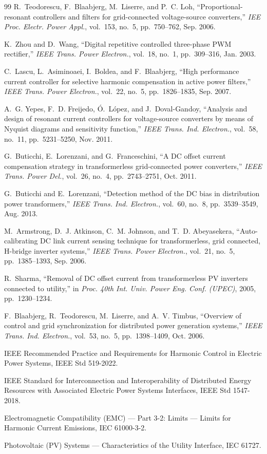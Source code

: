 \documentclass[11pt,a4paper]{article}
\begin{document}
\begin{thebibliography}{99}
R.~Teodorescu, F.~Blaabjerg, M.~Liserre, and P.~C. Loh, ``Proportional-resonant
controllers and filters for grid-connected voltage-source converters,'' \emph{IEE Proc.
Electr. Power Appl.}, vol.~153, no.~5, pp.~750--762, Sep. 2006.

K.~Zhou and D.~Wang, ``Digital repetitive controlled three-phase PWM rectifier,''
\emph{IEEE Trans. Power Electron.}, vol.~18, no.~1, pp.~309--316, Jan. 2003.

C.~Lascu, L.~Asiminoaei, I.~Boldea, and F.~Blaabjerg, ``High performance current
controller for selective harmonic compensation in active power filters,'' \emph{IEEE
Trans. Power Electron.}, vol.~22, no.~5, pp.~1826--1835, Sep. 2007.

A.~G. Yepes, F.~D. Freijedo, \'{O}.~L\'{o}pez, and J.~Doval-Gandoy, ``Analysis and design
of resonant current controllers for voltage-source converters by means of Nyquist
diagrams and sensitivity function,'' \emph{IEEE Trans. Ind. Electron.}, vol.~58, no.~11,
pp.~5231--5250, Nov. 2011.

G.~Buticchi, E.~Lorenzani, and G.~Franceschini, ``A DC offset current compensation
strategy in transformerless grid-connected power converters,'' \emph{IEEE Trans. Power
Del.}, vol.~26, no.~4, pp.~2743--2751, Oct. 2011.

G.~Buticchi and E.~Lorenzani, ``Detection method of the DC bias in distribution power
transformers,'' \emph{IEEE Trans. Ind. Electron.}, vol.~60, no.~8, pp.~3539--3549,
Aug. 2013.

M.~Armstrong, D.~J. Atkinson, C.~M. Johnson, and T.~D. Abeyasekera, ``Auto-calibrating
DC link current sensing technique for transformerless, grid connected, H-bridge inverter
systems,'' \emph{IEEE Trans. Power Electron.}, vol.~21, no.~5, pp.~1385--1393,
Sep. 2006.

R.~Sharma, ``Removal of DC offset current from transformerless PV inverters connected to
utility,'' in \emph{Proc. 40th Int. Univ. Power Eng. Conf. (UPEC)}, 2005, pp.~1230--1234.

F.~Blaabjerg, R.~Teodorescu, M.~Liserre, and A.~V. Timbus, ``Overview of control and grid
synchronization for distributed power generation systems,'' \emph{IEEE Trans. Ind.
Electron.}, vol.~53, no.~5, pp.~1398--1409, Oct. 2006.

IEEE Recommended Practice and Requirements for Harmonic Control in Electric Power
Systems, IEEE Std 519-2022.

IEEE Standard for Interconnection and Interoperability of Distributed Energy Resources
with Associated Electric Power Systems Interfaces, IEEE Std 1547-2018.

Electromagnetic Compatibility (EMC) --- Part 3-2: Limits --- Limits for Harmonic Current
Emissions, IEC 61000-3-2.

Photovoltaic (PV) Systems --- Characteristics of the Utility Interface, IEC 61727.

\end{thebibliography}
\end{document}
